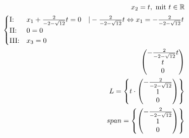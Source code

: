 \begin{longtable}{p{10cm}}
\end{longtable}

\begin{align*}
    x_2 = t, \text{ mit } t \in \mathbb{R} \\
    \begin{cases}
        \text{I:\@} & x_1 + \frac{2}{-2-\sqrt{12}}t = 0 \quad | - \frac{2}{-2-\sqrt{12}}t \Leftrightarrow x_1 = -\frac{2}{-2-\sqrt{12}}t\\
        \text{II:\@} & 0 = 0 \\
        \text{III:\@} & x_3 = 0
    \end{cases} \\
    \begin{pmatrix}
        -\frac{2}{-2-\sqrt{12}}t \\
        t \\
        0
    \end{pmatrix} \\
    L = \left\{t \cdot \begin{pmatrix}
        -\frac{2}{-2-\sqrt{12}} \\
        1 \\
        0
    \end{pmatrix}\right\} \\
    span = \left\{\begin{pmatrix}
        -\frac{2}{-2-\sqrt{12}} \\
        1 \\
        0
    \end{pmatrix}\right\}
\end{align*}

